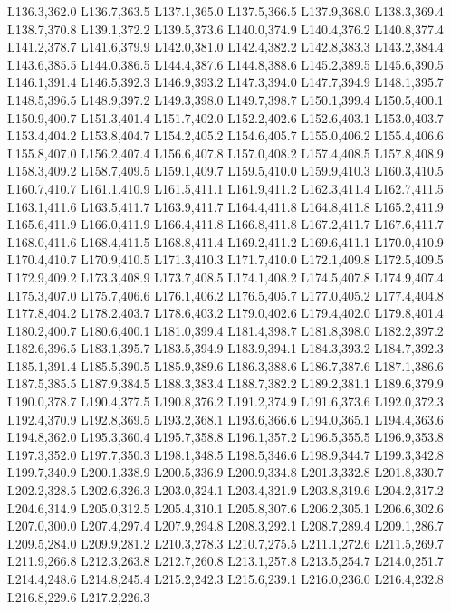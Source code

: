 		L136.3,362.0 L136.7,363.5 L137.1,365.0 L137.5,366.5 L137.9,368.0 L138.3,369.4 L138.7,370.8 L139.1,372.2
		L139.5,373.6 L140.0,374.9 L140.4,376.2 L140.8,377.4 L141.2,378.7 L141.6,379.9 L142.0,381.0 L142.4,382.2
		L142.8,383.3 L143.2,384.4 L143.6,385.5 L144.0,386.5 L144.4,387.6 L144.8,388.6 L145.2,389.5 L145.6,390.5
		L146.1,391.4 L146.5,392.3 L146.9,393.2 L147.3,394.0 L147.7,394.9 L148.1,395.7 L148.5,396.5 L148.9,397.2
		L149.3,398.0 L149.7,398.7 L150.1,399.4 L150.5,400.1 L150.9,400.7 L151.3,401.4 L151.7,402.0 L152.2,402.6
		L152.6,403.1 L153.0,403.7 L153.4,404.2 L153.8,404.7 L154.2,405.2 L154.6,405.7 L155.0,406.2 L155.4,406.6
		L155.8,407.0 L156.2,407.4 L156.6,407.8 L157.0,408.2 L157.4,408.5 L157.8,408.9 L158.3,409.2 L158.7,409.5
		L159.1,409.7 L159.5,410.0 L159.9,410.3 L160.3,410.5 L160.7,410.7 L161.1,410.9 L161.5,411.1 L161.9,411.2
		L162.3,411.4 L162.7,411.5 L163.1,411.6 L163.5,411.7 L163.9,411.7 L164.4,411.8 L164.8,411.8 L165.2,411.9
		L165.6,411.9 L166.0,411.9 L166.4,411.8 L166.8,411.8 L167.2,411.7 L167.6,411.7 L168.0,411.6 L168.4,411.5
		L168.8,411.4 L169.2,411.2 L169.6,411.1 L170.0,410.9 L170.4,410.7 L170.9,410.5 L171.3,410.3 L171.7,410.0
		L172.1,409.8 L172.5,409.5 L172.9,409.2 L173.3,408.9 L173.7,408.5 L174.1,408.2 L174.5,407.8 L174.9,407.4
		L175.3,407.0 L175.7,406.6 L176.1,406.2 L176.5,405.7 L177.0,405.2 L177.4,404.8 L177.8,404.2 L178.2,403.7
		L178.6,403.2 L179.0,402.6 L179.4,402.0 L179.8,401.4 L180.2,400.7 L180.6,400.1 L181.0,399.4 L181.4,398.7
		L181.8,398.0 L182.2,397.2 L182.6,396.5 L183.1,395.7 L183.5,394.9 L183.9,394.1 L184.3,393.2 L184.7,392.3
		L185.1,391.4 L185.5,390.5 L185.9,389.6 L186.3,388.6 L186.7,387.6 L187.1,386.6 L187.5,385.5 L187.9,384.5
		L188.3,383.4 L188.7,382.2 L189.2,381.1 L189.6,379.9 L190.0,378.7 L190.4,377.5 L190.8,376.2 L191.2,374.9
		L191.6,373.6 L192.0,372.3 L192.4,370.9 L192.8,369.5 L193.2,368.1 L193.6,366.6 L194.0,365.1 L194.4,363.6
		L194.8,362.0 L195.3,360.4 L195.7,358.8 L196.1,357.2 L196.5,355.5 L196.9,353.8 L197.3,352.0 L197.7,350.3
		L198.1,348.5 L198.5,346.6 L198.9,344.7 L199.3,342.8 L199.7,340.9 L200.1,338.9 L200.5,336.9 L200.9,334.8
		L201.3,332.8 L201.8,330.7 L202.2,328.5 L202.6,326.3 L203.0,324.1 L203.4,321.9 L203.8,319.6 L204.2,317.2
		L204.6,314.9 L205.0,312.5 L205.4,310.1 L205.8,307.6 L206.2,305.1 L206.6,302.6 L207.0,300.0 L207.4,297.4
		L207.9,294.8 L208.3,292.1 L208.7,289.4 L209.1,286.7 L209.5,284.0 L209.9,281.2 L210.3,278.3 L210.7,275.5
		L211.1,272.6 L211.5,269.7 L211.9,266.8 L212.3,263.8 L212.7,260.8 L213.1,257.8 L213.5,254.7 L214.0,251.7
		L214.4,248.6 L214.8,245.4 L215.2,242.3 L215.6,239.1 L216.0,236.0 L216.4,232.8 L216.8,229.6 L217.2,226.3
